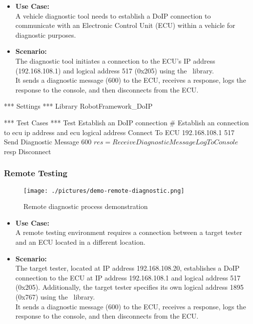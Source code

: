            \begin{itemize}
                \item\textbf{Use Case:}\\
                    A vehicle diagnostic tool needs to establish a DoIP connection to communicate with an Electronic Control Unit (ECU)
                    within a vehicle for diagnostic purposes.

                \item\textbf{Scenario:} \\
                    The diagnostic tool initiates a connection to the ECU's IP address (192.168.108.1) and logical address 517 (0x205) using 
                    the \pkg\ library. \\
                    It sends a diagnostic message (600) to the ECU, receives a response, logs the response 
                    to the console, and then disconnects from the ECU.
            \end{itemize}

        \begin{robotcode}
*** Settings ***
Library    RobotFramework_DoIP

*** Test Cases ***
Test Establish an DoIP connection
    # Establish an connection to ecu ip address and ecu logical address
    Connect To ECU     192.168.108.1      517
    Send Diagnostic Message     600
    ${res}= Receive Diagnostic Message
    Log To Console    ${resp}
    Disconnect
        \end{robotcode}

        \subsubsection{Remote Testing}
            \begin{figure}[htbp]
                \centering
                \texttt{[image: ./pictures/demo-remote-diagnostic.png]}
                \caption{Remote diagnostic process demonstration}
                \label{fig:2.3}
            \end{figure}

            \begin{itemize}
                \item\textbf{Use Case:}\\
                    A remote testing environment requires a connection between a target tester and an ECU located in a different location.

                \item\textbf{Scenario:} \\
                    The target tester, located at IP address 192.168.108.20, establishes a DoIP connection to the ECU at IP address 192.168.108.1 
                    and logical address 517 (0x205). Additionally, the target tester specifies its own logical address 1895 (0x767) using the \pkg\ 
                    library. \\
                    It sends a diagnostic message (600) to the ECU, receives a response, logs the response to the console, and then disconnects 
                    from the ECU.
            \end{itemize}

